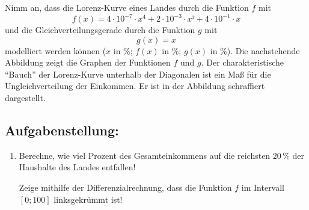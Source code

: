 \begin{langesbeispiel}
				Nimm an, dass die Lorenz-Kurve eines Landes durch die Funktion $f$ mit
				$$f(x)=4\cdot 10^{-7}\cdot x^4+2\cdot 10^{-3}\cdot x²+4\cdot 10^{-1}\cdot x$$
				und die Gleichverteilungsgerade durch die Funktion $g$ mit
				$$g(x)=x$$
				modelliert werden können ($x$ in \%; $f(x)$ in \%; $g(x)$ in \%). Die nachstehende Abbildung zeigt die Graphen der Funktionen $f$ und $g$. Der charakteristische "`Bauch"' der Lorenz-Kurve unterhalb der Diagonalen ist ein Maß für die Ungleichverteilung der Einkommen. Er ist in der Abbildung schraffiert dargestellt.
				
				\begin{center}
				\end{center}

\subsection{Aufgabenstellung:}
\begin{enumerate}
	\item {} Berechne, wie viel Prozent des Gesamteinkommens auf die reichsten $20\,\%$ der Haushalte des Landes entfallen!
	
	Zeige mithilfe der Differenzialrechnung, dass die Funktion $f$ im Intervall $[0;100]$ linksgekrümmt ist!
	

\end{enumerate}
\end{langesbeispiel}
